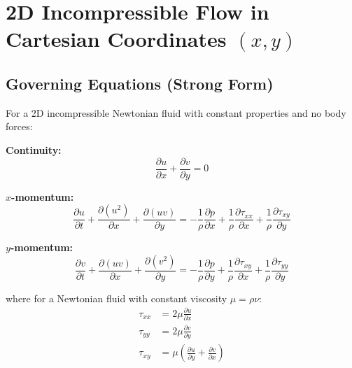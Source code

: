 
\section{2D Incompressible Flow in Cartesian Coordinates $(x,y)$}
\label{sec:cartesian}

\subsection{Governing Equations (Strong Form)}

For a 2D incompressible Newtonian fluid with constant properties and no body forces:

\textbf{Continuity:}
\begin{equation}
    \frac{\partial u}{\partial x} + \frac{\partial v}{\partial y} = 0
    \label{eq:cart_cont}
\end{equation}

\textbf{$x$-momentum:}
\begin{equation}
    \frac{\partial u}{\partial t}
    + \frac{\partial(u^2)}{\partial x}
    + \frac{\partial(uv)}{\partial y}
    = -\frac{1}{\rho}\frac{\partial p}{\partial x}
    + \frac{1}{\rho}\frac{\partial\tau_{xx}}{\partial x}
    + \frac{1}{\rho}\frac{\partial\tau_{xy}}{\partial y}
    \label{eq:cart_momx}
\end{equation}

\textbf{$y$-momentum:}
\begin{equation}
    \frac{\partial v}{\partial t}
    + \frac{\partial(uv)}{\partial x}
    + \frac{\partial(v^2)}{\partial y}
    = -\frac{1}{\rho}\frac{\partial p}{\partial y}
    + \frac{1}{\rho}\frac{\partial\tau_{xy}}{\partial x}
    + \frac{1}{\rho}\frac{\partial\tau_{yy}}{\partial y}
    \label{eq:cart_momy}
\end{equation}

where for a Newtonian fluid with constant viscosity $\mu = \rho\nu$:
\begin{align}
    \tau_{xx} &= 2\mu\frac{\partial u}{\partial x}
    \\
    \tau_{yy} &= 2\mu\frac{\partial v}{\partial y}
    \\
    \tau_{xy} &= \mu\!\left(\frac{\partial u}{\partial y}+\frac{\partial v}{\partial x}\right)
\end{align}

